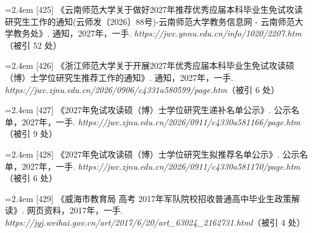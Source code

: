 {\vspace{0.6pt}
\vspace{3.5pt}\par
\nopagebreak\vspace{1pt}
\noindent\hangindent=2.4em \label{src:S0568}{\color{cAccent}[425]} 《云南师范大学关于做好2027年推荐优秀应届本科毕业生免试攻读研究生工作的通知(云师发〔2026〕88号)-云南师范大学教务信息网 - 云南师范大学教务处》. 通知，2027年，一手. \textit{https://jwc.ynnu.edu.cn/info/1020/2207.htm}（被引 52 处）\par
\vspace{0.6pt}
\vspace{3.5pt}\par
\nopagebreak\vspace{1pt}
\noindent\hangindent=2.4em \label{src:S0569}{\color{cAccent}[426]} 《浙江师范大学关于开展2027年优秀应届本科毕业生免试攻读硕（博）士学位研究生推荐工作的通知》. 通知，2027年，一手. \textit{https://jwc.zjnu.edu.cn/2026/0906/c4331a580599/page.htm}（被引 6 处）\par
\vspace{0.6pt}
\vspace{3.5pt}\par
\nopagebreak\vspace{1pt}
\noindent\hangindent=2.4em \label{src:S0570}{\color{cAccent}[427]} 《2027年免试攻读硕（博）士学位研究生递补名单公示》. 公示名单，2027年，一手. \textit{https://jwc.zjnu.edu.cn/2026/0911/c4330a581166/page.htm}（被引 9 处）\par
\vspace{0.6pt}
\noindent\hangindent=2.4em \label{src:S0571}{\color{cAccent}[428]} 《2027年免试攻读硕（博）士学位研究生拟推荐名单公示》. 公示名单，2027年，一手. \textit{https://jwc.zjnu.edu.cn/2026/0911/c4330a581170/page.htm}（被引 6 处）\par
\vspace{0.6pt}
\vspace{3.5pt}\par
\nopagebreak\vspace{1pt}
\noindent\hangindent=2.4em \label{src:S0572}{\color{cAccent}[429]} 《威海市教育局 高考 2017年军队院校招收普通高中毕业生政策解读》. 网页资料，2017年，一手. \textit{https://jyj.weihai.gov.cn/art/2017/6/20/art\_63024\_2162731.html}（被引 4 处）\par
}
